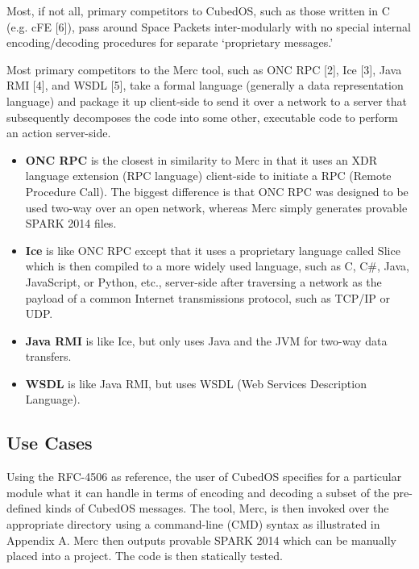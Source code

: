 Most, if not all, primary competitors to CubedOS, such as those written in C (e.g. cFE [6]),
pass around Space Packets inter-modularly with no special internal encoding/decoding procedures
for separate ‘proprietary messages.’

Most primary competitors to the Merc tool, such as ONC RPC [2], Ice [3], Java RMI [4], and
WSDL [5], take a formal language (generally a data representation language) and package it up
client-side to send it over a network to a server that subsequently decomposes the code into
some other, executable code to perform an action server-side.

\begin{itemize}
\item \textbf{ONC RPC} is the closest in similarity to Merc in that it uses an XDR language
  extension (RPC language) client-side to initiate a RPC (Remote Procedure Call). The biggest
  difference is that ONC RPC was designed to be used two-way over an open network, whereas
  Merc simply generates provable SPARK 2014 files.

\item \textbf{Ice} is like ONC RPC except that it uses a proprietary language called Slice which
  is then compiled to a more widely used language, such as C, C\#, Java, JavaScript, or Python,
  etc., server-side after traversing a network as the payload of a common Internet transmissions
  protocol, such as TCP/IP or UDP.

\item \textbf{Java RMI} is like Ice, but only uses Java and the JVM for two-way data transfers.

\item \textbf{WSDL} is like Java RMI, but uses WSDL (Web Services Description Language).
\end{itemize}

\subsection{Use Cases}

Using the RFC-4506 as reference, the user of CubedOS specifies for a particular module what it
can handle in terms of encoding and decoding a subset of the pre-defined kinds of CubedOS
messages. The tool, Merc, is then invoked over the appropriate directory using a command-line
(CMD) syntax as illustrated in Appendix A. Merc then outputs provable SPARK 2014 which can be
manually placed into a project. The code is then statically tested.

